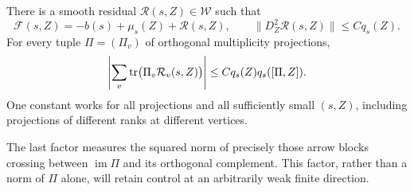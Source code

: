 \begin{proposition}\label{prop:projection}
There is a smooth residual $\mathcal R(s,Z)\in\mathcal W$ such that
\begin{equation}\label{eq:reducedexpansion}
\mathcal F(s,Z)=-b(s)+\mu_s(Z)+\mathcal R(s,Z),\qquad
\|D_Z^2\mathcal R(s,Z)\|\le Cq_s(Z).
\end{equation}
For every tuple $\Pi=(\Pi_v)$ of orthogonal multiplicity projections,
\begin{equation}\label{eq:projectionestimate}
\left|\sum_v\operatorname{tr}\bigl(\Pi_v\mathcal R_v(s,Z)\bigr)\right|
\le Cq_s(Z)q_s([\Pi,Z]).
\end{equation}
One constant works for all projections and all sufficiently small
$(s,Z)$, including projections of different ranks at different vertices.
\end{proposition}

The last factor measures the squared norm of precisely those arrow
blocks crossing between $\operatorname{im}\Pi$ and its orthogonal
complement. This factor, rather than a norm of $\Pi$ alone, will
retain control at an arbitrarily weak finite direction.

